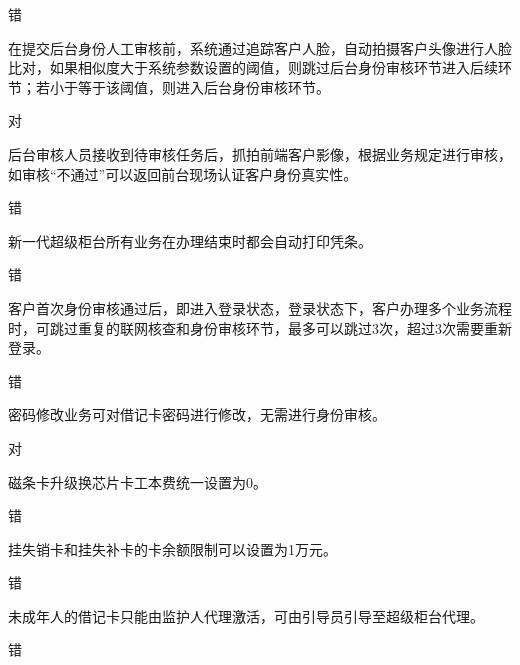 \documentclass[kindlepaper]{BHCexam4kindle}
\begin{document}
\begin{questions}
\begin{solution} 错 \end{solution}
\qs 在提交后台身份人工审核前，系统通过追踪客户人脸，自动拍摄客户头像进行人脸比对，如果相似度大于系统参数设置的阈值，则跳过后台身份审核环节进入后续环节；若小于等于该阈值，则进入后台身份审核环节。 \xx
\begin{solution} 对 \end{solution}
\qs 后台审核人员接收到待审核任务后，抓拍前端客户影像，根据业务规定进行审核，如审核“不通过”可以返回前台现场认证客户身份真实性。 \xx
\begin{solution} 错 \end{solution}
\qs 新一代超级柜台所有业务在办理结束时都会自动打印凭条。 \xx
\begin{solution} 错 \end{solution}
\qs 客户首次身份审核通过后，即进入登录状态，登录状态下，客户办理多个业务流程时，可跳过重复的联网核查和身份审核环节，最多可以跳过3次，超过3次需要重新登录。 \xx
\begin{solution} 错 \end{solution}
\qs 密码修改业务可对借记卡密码进行修改，无需进行身份审核。
 \xx
\begin{solution} 对 \end{solution}
\qs 磁条卡升级换芯片卡工本费统一设置为0。 \xx
\begin{solution} 错 \end{solution}
\qs 挂失销卡和挂失补卡的卡余额限制可以设置为1万元。 \xx
\begin{solution} 错 \end{solution}
\qs 未成年人的借记卡只能由监护人代理激活，可由引导员引导至超级柜台代理。 \xx
\begin{solution} 错 \end{solution}

\end{questions}
\end{document}
